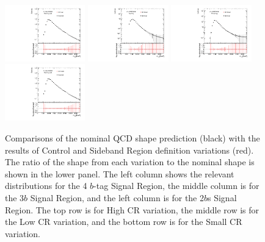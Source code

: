 \begin{figure}[htbp!]
\begin{center}
\includegraphics[width=0.31\textwidth,angle=-90]{figures/boosted/Syst_CRSB/CR_Low_compare_TwoTag_split_qcd_hh.pdf}
\includegraphics[width=0.31\textwidth,angle=-90]{figures/boosted/Syst_CRSB/CR_Small_compare_FourTag_qcd_hh.pdf}
\includegraphics[width=0.31\textwidth,angle=-90]{figures/boosted/Syst_CRSB/CR_Small_compare_ThreeTag_qcd_hh.pdf}
\includegraphics[width=0.31\textwidth,angle=-90]{figures/boosted/Syst_CRSB/CR_Small_compare_TwoTag_split_qcd_hh.pdf}
\end{center}
\caption{Comparisons of the nominal QCD shape prediction (black) with the results of Control and Sideband Region definition variations (red). The ratio of the shape from each variation to the nominal shape is shown in the lower panel. The left column shows the relevant distributions for the 4 $b$-tag Signal Region, the middle column is for the 3$b$ Signal Region, and the left column is for the 2$b$s Signal Region. The top row is for High CR variation, the middle row is for the Low CR variation, and the bottom row is for the Small CR variation.}
\label{CRSB:QCDShapeSR-CR}
\end{figure}

